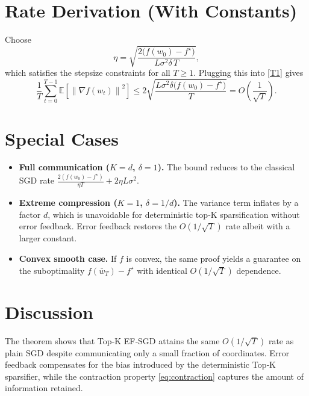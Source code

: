 \documentclass{article}
\newcommand{\E}{\mathbb{E}}
\newcommand{\norm}[1]{\left\lVert#1\right\rVert}
\begin{document}
\section*{Rate Derivation (With Constants)}
Choose
\[
\eta = \sqrt{\frac{2\bigl(f(w_0)-f^\star\bigr)}{L\sigma^{2}\delta\,T}},
\]
which satisfies the stepsize constraints for all $T\ge1$.  Plugging this
into \eqref{T1} gives
\[
\frac{1}{T}\sum_{t=0}^{T-1}\E\!\left[\norm{\nabla f(w_t)}^{2}\right]
\le
2\sqrt{\frac{L\sigma^{2}\delta\bigl(f(w_0)-f^\star\bigr)}{T}}
= O\!\left(\frac{1}{\sqrt{T}}\right).
\]

\section*{Special Cases}
\begin{itemize}
\item \textbf{Full communication ($K=d$, $\delta=1$).}
  The bound reduces to the classical SGD rate
  $\frac{2(f(w_0)-f^\star)}{\eta T}+2\eta L\sigma^{2}$.
\item \textbf{Extreme compression ($K=1$, $\delta=1/d$).}
  The variance term inflates by a factor $d$, which is unavoidable for
  deterministic top‑K sparsification without error feedback.  Error
  feedback restores the $O(1/\sqrt{T})$ rate albeit with a larger constant.
\item \textbf{Convex smooth case.}
  If $f$ is convex, the same proof yields a guarantee on the suboptimality
  $f(\bar w_T)-f^\star$ with identical $O(1/\sqrt{T})$ dependence.
\end{itemize}

\section*{Discussion}
The theorem shows that Top‑K EF‑SGD attains the same $O(1/\sqrt{T})$ rate as
plain SGD despite communicating only a small fraction of coordinates.
Error feedback compensates for the bias introduced by the deterministic
Top‑K sparsifier, while the contraction property \eqref{eq:contraction}
captures the amount of information retained.

\end{document}
